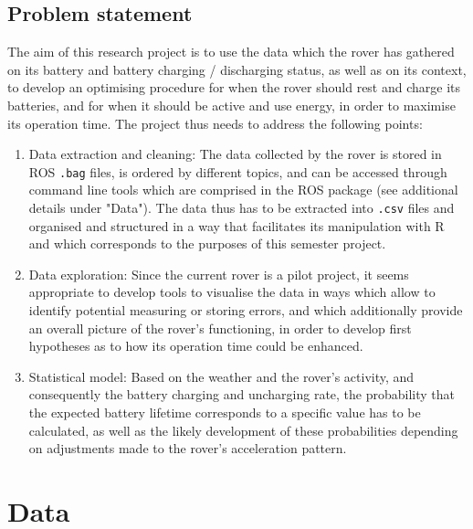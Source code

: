 \documentclass[11pt, UKenglish]{report}
\begin{document}
{\subsection*{Problem statement}

The aim of this research project is to use the data which the rover has gathered on its battery and battery charging / discharging status, as well as on its context, to develop an optimising procedure for when the rover should rest and charge its batteries, and for when it should be active and use energy, in order to maximise its operation time. The project thus needs to address the following points:

\begin{enumerate}

	\item{\large{Data extraction and cleaning:} \normalsize The data collected by the rover is stored in ROS \texttt{.bag} files, is ordered by different topics, and can be accessed through command line tools which are comprised in the ROS package (see additional details under "Data"). The data thus has to be extracted into \texttt{.csv} files and organised and structured in a way that facilitates its manipulation with R and which corresponds to the purposes of this semester project.}

	\item{\large{Data exploration:} \normalsize Since the current rover is a pilot project, it seems appropriate to develop tools to visualise the data in ways which allow to identify potential measuring or storing errors, and which additionally provide an overall picture of the rover's functioning, in order to develop first hypotheses as to how its operation time could be enhanced.}

	\item{\large{Statistical model:} \normalsize Based on the weather and the rover's activity, and consequently the battery charging and uncharging rate, the probability that the expected battery lifetime corresponds to a specific value has to be calculated, as well as the likely development of these probabilities depending on adjustments made to the rover's acceleration pattern. }

\end{enumerate}


\section*{Data}

}
\end{document}
